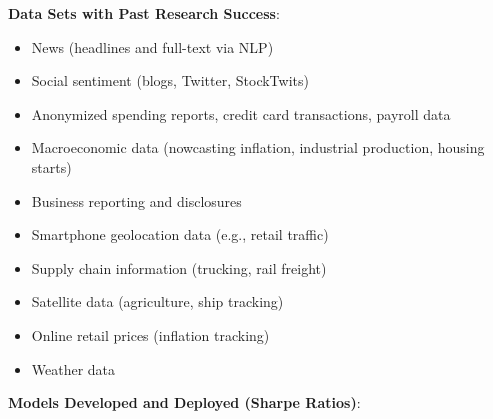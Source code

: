 \documentclass[11pt, letterpaper]{article}
\begin{document}
  \textbf{Data Sets with Past Research Success}:

  \begin{itemize}
    \item News (headlines and full-text via NLP)

    \item Social sentiment (blogs, Twitter, StockTwits)

    \item Anonymized spending reports, credit card transactions, payroll
      data

    \item Macroeconomic data (nowcasting inflation, industrial production,
      housing starts)

    \item Business reporting and disclosures

    \item Smartphone geolocation data (e.g., retail traffic)

    \item Supply chain information (trucking, rail freight)

    \item Satellite data (agriculture, ship tracking)

    \item Online retail prices (inflation tracking)

    \item Weather data
  \end{itemize}

  \textbf{Models Developed and Deployed (Sharpe Ratios)}:
\end{document}

